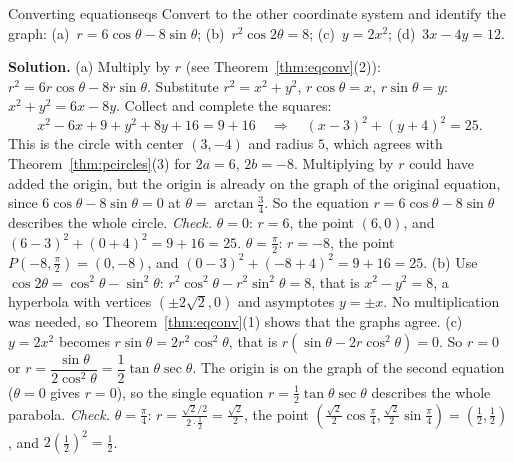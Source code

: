 \documentclass[11pt]{article}
\begin{document}
\begin{exmp}{Converting equations}{eqs}
Convert to the other coordinate system and identify the graph: (a)~$r=6\cos\theta-8\sin\theta$; (b)~$r^2\cos2\theta=8$; (c)~$y=2x^2$; (d)~$3x-4y=12$.

\textbf{Solution.} (a) Multiply by $r$ (see Theorem~\ref{thm:eqconv}(2)): $r^2=6r\cos\theta-8r\sin\theta$. Substitute $r^2=x^2+y^2$, $r\cos\theta=x$, $r\sin\theta=y$: $x^2+y^2=6x-8y$. Collect and complete the squares:
\[
x^2-6x+9+y^2+8y+16=9+16\quad\Longrightarrow\quad(x-3)^2+(y+4)^2=25.
\]
This is the circle with center $(3,-4)$ and radius $5$, which agrees with Theorem~\ref{thm:pcircles}(3) for $2a=6$, $2b=-8$. Multiplying by $r$ could have added the origin, but the origin is already on the graph of the original equation, since $6\cos\theta-8\sin\theta=0$ at $\theta=\arctan\frac34$. So the equation $r=6\cos\theta-8\sin\theta$ describes the whole circle. \emph{Check.} $\theta=0$: $r=6$, the point $(6,0)$, and $(6-3)^2+(0+4)^2=9+16=25$. $\theta=\frac\pi2$: $r=-8$, the point $P\left(-8,\frac\pi2\right)=(0,-8)$, and $(0-3)^2+(-8+4)^2=9+16=25$.
(b) Use $\cos2\theta=\cos^2\theta-\sin^2\theta$: $r^2\cos^2\theta-r^2\sin^2\theta=8$, that is $x^2-y^2=8$, a hyperbola with vertices $(\pm2\sqrt2,0)$ and asymptotes $y=\pm x$. No multiplication was needed, so Theorem~\ref{thm:eqconv}(1) shows that the graphs agree.
(c) $y=2x^2$ becomes $r\sin\theta=2r^2\cos^2\theta$, that is $r\left(\sin\theta-2r\cos^2\theta\right)=0$. So $r=0$ or $r=\dfrac{\sin\theta}{2\cos^2\theta}=\dfrac12\tan\theta\sec\theta$. The origin is on the graph of the second equation ($\theta=0$ gives $r=0$), so the single equation $r=\frac12\tan\theta\sec\theta$ describes the whole parabola. \emph{Check.} $\theta=\frac\pi4$: $r=\frac{\sqrt2/2}{2\cdot\frac12}=\frac{\sqrt2}2$, the point $\left(\frac{\sqrt2}2\cos\frac\pi4,\frac{\sqrt2}2\sin\frac\pi4\right)=\left(\frac12,\frac12\right)$, and $2\left(\frac12\right)^2=\frac12$.

\end{exmp}
\end{document}

